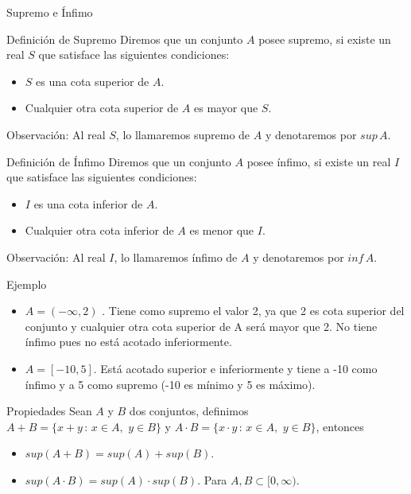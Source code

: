 \documentclass[5pt]{beamer} %
\begin{document}
\begin{frame}{Supremo e Ínfimo}
\begin{block}{Definición de Supremo}
	Diremos que un conjunto $A$ posee supremo, si existe un real $S$ que satisface
	las siguientes condiciones:
	\begin{itemize}
		\item $S$ es una cota superior de $A$.
		\item Cualquier otra cota superior de $A$ es mayor que $S$.
	\end{itemize}
Observación: Al real $S$, lo llamaremos supremo de $A$ y denotaremos por $sup\,A$.
\end{block}

\begin{block}{Definición de Ínfimo}
	Diremos que un conjunto $A$ posee ínfimo, si existe un real $I$ que satisface
	las siguientes condiciones:
	\begin{itemize}
		\item $I$ es una cota inferior de $A$.
		\item Cualquier otra cota inferior de $A$ es menor que $I$.
	\end{itemize}
Observación: Al real $I$, lo llamaremos ínfimo de $A$ y denotaremos por $inf\,A$.
\end{block}
\end{frame}

\begin{frame}
	\begin{exampleblock}{Ejemplo}
		\begin{itemize}
			\item $A = (-\infty, 2)$ . Tiene como supremo el valor 2, ya que 2 es cota superior del conjunto y
			cualquier otra cota superior de A será mayor que 2. No tiene ínfimo pues no está acotado inferiormente.
			\item  $A = [-10, 5]$. Está acotado superior e inferiormente y tiene a -10 como ínfimo y a 5 como supremo (-10 es mínimo y 5 es máximo).
		\end{itemize}
	\end{exampleblock}
		
		\begin{block}{Propiedades}
		Sean $A$ y $B$ dos conjuntos, definimos $A + B = \{x + y\, :\, x \in A,\,\, y\in B\}$ y $A \cdot B =
		\{x \cdot y \,: \,x \in A,\,\, y \in B\}$, entonces
		\begin{itemize}
			\item $sup(A + B) = sup(A) + sup(B)$.
			\item $sup(A \cdot B) = sup(A) \cdot sup(B)$. Para $A,B \subset [0,\infty)$.
		\end{itemize}
		\end{block}
		\end{frame}
\end{document}
